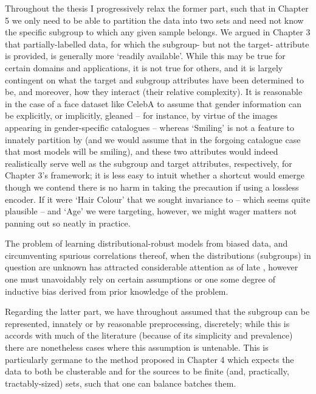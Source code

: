 %
Throughout the thesis I progressively relax the former part, such that in Chapter 5 we only need to
be able to partition the data into two sets and need not know the specific subgroup to which any
given sample belongs.
%
We argued in Chapter 3 that partially-labelled data, for which the subgroup- but not the target-
attribute is provided, is generally more `readily available'. 
%
While this may be true for certain domains and applications, it is not true for others, and it is
largely contingent on what the target and subgroup attributes have been determined to be, and
moreover, how they interact (their relative complexity).
%
It is reasonable in the case of a face dataset like CelebA to assume that gender information can be
explicitly, or implicitly, gleaned -- for instance, by virtue of the images appearing in
gender-specific catalogues -- whereas `Smiling' is not a feature to innately partition by (and we
would assume that in the forgoing catalogue case that most models will be smiling), and these two
attributes would indeed realistically serve well as the subgroup and target attributes,
respectively, for Chapter 3's framework; it is less easy to intuit whether a shortcut would emerge
though we contend there is no harm in taking the precaution if using a lossless encoder.
%
If it were `Hair Colour' that we sought invariance to -- which seems quite plausible -- and `Age'
we were targeting, however, we might wager matters not panning out so neatly in practice.

%
The problem of learning distributional-robust models from biased data, and circumventing spurious
correlations thereof, when the distributions (subgroups) in question are unknown has attracted
considerable attention as of late \citep{HasSriNamLia18, creager2021environment, liu2021just,
taghanaki2022masktune, kim2022learning}, however one must unavoidably rely on certain assumptions
or one some degree of inductive bias derived from prior knowledge of the problem.

Regarding the latter part, we have throughout assumed that the subgroup can be represented, innately or
by reasonable preprocessing, discretely; while this is accords with much of the literature (because
of its simplicity and prevalence) there are nonetheless cases where this assumption is untenable.
%
This is particularly germane to the method proposed in Chapter 4 which expects the data to both be
clusterable and for the sources to be finite (and, practically, tractably-sized) sets, such that
one can balance batches \wrt{} them.

